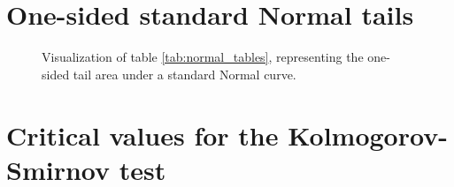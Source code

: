 \begin{table}[H]
	
\end{table}

\clearpage


\section{One-sided standard Normal tails}
\label{tables:normal}

\begin{table}[H]
	\centering
	\begin{minipage}{0.45\textwidth}
		\centering
		
	\end{minipage}
	\begin{minipage}{0.45\textwidth}
		\centering
		
	\end{minipage}
	\caption{One-tailed integral of standard Normal distribution at different $\alpha$ and $\sigma$}
	\label{tab:normal_tables}
\end{table}

\begin{figure}[H]
	\centering
	
	\caption{Visualization of table \ref{tab:normal_tables}, representing the one-sided tail area under a standard Normal curve.}
	\label{fig:normal_table_visualization}
\end{figure}

\clearpage
\section{Critical values for the Kolmogorov-Smirnov test}

\begin{table}[H]
	
	\caption{Critical values for the Kolmogorov-Smirnov test at different sample sizes and significance levels. The last row shows the critical value that must be scaled with the square root of the sample size for large $n$.}
	\label{tab:ks_table_values}
\end{table}
